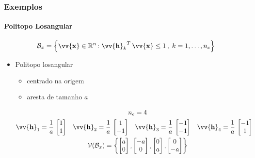 \documentclass{beamer}
\newcommand*{\Curly}[1]{\left\{#1\right\}}
\newcommand*{\Set}[1]{\Curly{#1}}
\newcommand*{\Prod}{\,}
\newcommand*{\Bold}[1]{\boldsymbol{\mathbf{#1}}}
\newcommand*{\Vect}[1]{\vv{\Bold{#1}}}
\newcommand*{\Transp}[1]{{#1}^{T}}
\renewcommand{\Prod}{\,}
\begin{document}
\begin{frame}\frametitle{Exemplos}\framesubtitle{Politopo Losangular}
  \begin{equation}
    \mathcal{B}_x
    = \Set{\Vect{x} \in \mathbb{R}^n \colon \Transp{\Vect{h}_k} \Prod \Vect{x} \leq 1 \,,\; k = 1, \dotsc, n_e}
  \end{equation}
  \begin{itemize}
    \item Politopo losangular
    \begin{itemize}
      \item centrado na origem
      \item aresta de tamanho $a$
    \end{itemize}
    \begin{gather}
      n_e = 4
      \\
      \begin{aligned}
        \Vect{h}_1 &= \frac{1}{a} \Prod \begin{bmatrix} 1 \\ 1 \end{bmatrix}
        &
        \Vect{h}_2 &= \frac{1}{a} \Prod \begin{bmatrix} 1 \\ -1 \end{bmatrix}
        &
        \Vect{h}_3 &= \frac{1}{a} \Prod \begin{bmatrix} -1 \\ -1 \end{bmatrix}
        &
        \Vect{h}_4 &= \frac{1}{a} \Prod \begin{bmatrix} -1 \\ 1 \end{bmatrix}
      \end{aligned}
      \\
      \mathcal{V}(\mathcal{B}_x) = \left\{
      \begin{bmatrix} a \\ 0 \end{bmatrix}
      ,
      \begin{bmatrix} -a \\ 0 \end{bmatrix}
      ,
      \begin{bmatrix} 0 \\ a \end{bmatrix}
      ,
      \begin{bmatrix} 0 \\ -a \end{bmatrix}
      \right\}
    \end{gather}
  \end{itemize}
\end{frame}
\end{document}
